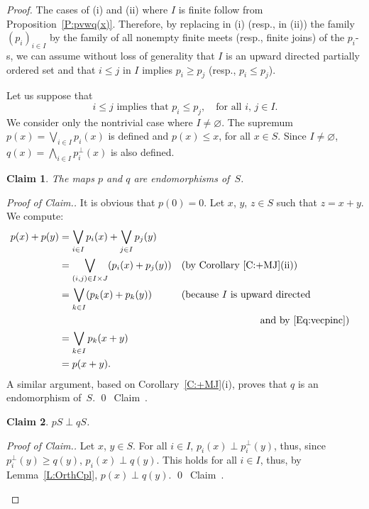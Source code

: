 \documentclass[psamsfonts,reqno]{memo-l}
\theoremstyle{plain}
\newtheorem{claim}{Claim}
\theoremstyle{definition}
\theoremstyle{remark}
\newcommand{\qedc}{{\qed}~{\rm Claim~{\theclaim}.}}
\newenvironment{cproof}
{\begin{proof}[Proof of Claim.]}
{\qedc\renewcommand{\qed}{}\end{proof}}
\numberwithin{equation}{section}
\newcommand{\es}{\varnothing}
\newcommand{\famm}[2]{(#1)_{#2}}
\begin{document}
\begin{proof}
The cases of (i) and (ii) where $I$ is finite follow from
Proposition~\ref{P:pvwq(x)}. Therefore, by replacing in (i) (resp., in (ii))
the family $\famm{p_i}{i\in I}$ by the family of all nonempty finite meets
(resp., finite joins) of the $p_i$-s, we can assume without loss of generality
that $I$ is an upward directed partially ordered set and that $i\leq j$ in
$I$ implies $p_i\geq p_j$ (resp., $p_i\leq p_j$).

Let us suppose that
   \begin{equation}\label{Eq:vecpinc}
   i\leq j\text{ implies that }p_i\leq p_j,\quad\text{for all }i,\,j\in I.
   \end{equation}
We consider only the nontrivial case where $I\ne\es$. The
supremum $p(x)=\bigvee_{i\in I}p_i(x)$ is defined and
$p(x)\leq x$, for all $x\in S$. Since $I\ne\es$,
$q(x)=\bigwedge_{i\in I}p_i^\bot(x)$ is also defined.

\setcounter{claim}{0}
\begin{claim}
The maps $p$ and $q$ are endomorphisms of~$S$.
\end{claim}

\begin{cproof}
It is obvious that $p(0)=0$.
Let $x$, $y$, $z\in S$ such that $z=x+y$. We compute:
   \begin{align*}
   p(x)+p(y)&=\bigvee_{i\in I}p_i(x)+\bigvee_{j\in I}p_j(y)\\
   &=\bigvee_{(i,j)\in I\times J}(p_i(x)+p_j(y))
   &&(\text{by Corollary~\ref{C:+MJ}(ii)})\\
   &=\bigvee_{k\in I}(p_k(x)+p_k(y))
   &&(\text{because }I\text{ is upward directed}\\
   &&&\text{\hphantom{because is upward}} \text{and by
\eqref{Eq:vecpinc}})\\
   &=\bigvee_{k\in I}p_k(x+y)\\
   &=p(x+y).
   \end{align*}
A similar argument, based on Corollary~\ref{C:+MJ}(i), proves that $q$ is an
endomorphism of~$S$.
\end{cproof}

\begin{claim}
$pS\perp qS$.
\end{claim}

\begin{cproof}
Let $x$, $y\in S$. For all $i\in I$, $p_i(x)\perp p_i^\bot(y)$, thus, since
$p_i^\bot(y)\geq q(y)$, $p_i(x)\perp q(y)$. This holds for all $i\in I$,
thus, by Lemma~\ref{L:OrthCpl}, $p(x)\perp q(y)$.
\end{cproof}


\end{proof}
\end{document}
